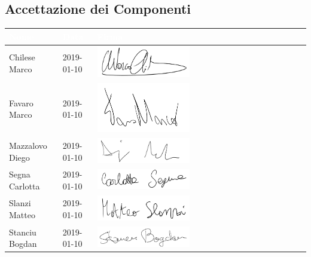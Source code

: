\subsection{Accettazione dei Componenti}

\begin{longtable}{|C{.25\textwidth}|C{.16\textwidth}|C{.45\textwidth}|}
\hline
{}\textbf{\textcolor{white}{Nome}} & \textbf{\textcolor{white}{Data}} & \textbf{\textcolor{white}{Firma}}\\
\hline \hline
\endfirsthead
Chilese Marco & 2019-01-10 & \includegraphics[width=0.45\textwidth]{./images/PNG/MarcoChilese.png} \\
\hline
{}Favaro Marco & 2019-01-10 & \includegraphics[width=0.45\textwidth]{./images/PNG/MarcoFavaro.png} \\
\hline
Mazzalovo Diego & 2019-01-10 & \includegraphics[width=0.45\textwidth]{./images/PNG/DiegoMazzalovo.png} \\
\hline
{}Segna Carlotta & 2019-01-10 & \includegraphics[width=0.45\textwidth]{./images/PNG/CarlottaSegna.png} \\
\hline
Slanzi Matteo & 2019-01-10 & \includegraphics[width=0.45\textwidth]{./images/PNG/MatteoSlanzi.png} \\
\hline
{}Stanciu Bogdan & 2019-01-10 & \includegraphics[width=0.45\textwidth]{./images/PNG/BogdanStanciu.png} \\

\end{longtable}
